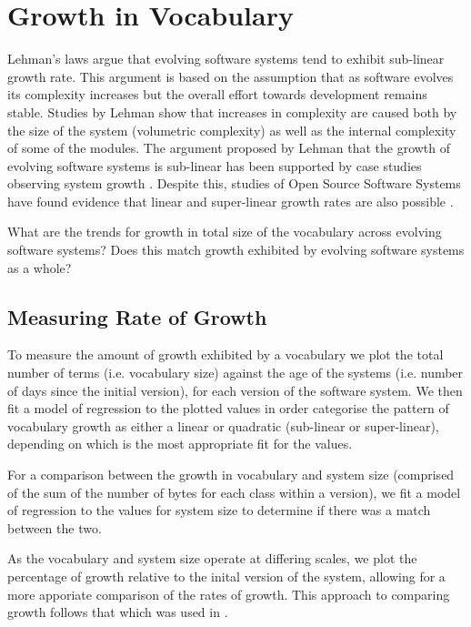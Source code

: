 \section{Growth in Vocabulary} %
\label{sec:growth_in_vocabulary}

Lehman's laws argue that evolving software systems tend to exhibit sub-linear growth rate. This argument is based on the assumption that as software evolves its complexity increases but the overall effort towards development remains stable. Studies by Lehman \cite{Lehman97a} show that increases in complexity are caused both by the size of the system (volumetric complexity) as well as the internal complexity of some of the modules. The argument proposed by Lehman that the growth of evolving software systems is sub-linear has been supported by case studies observing system growth \cite{DAmbros07a, Gall97a, Lehman97a}. Despite this, studies of Open Source Software Systems have found evidence that linear and super-linear growth rates are also possible \cite{Godfrey01a,Israeli09a,Succi01a}.

What are the trends for growth in total size of the vocabulary across evolving software systems? Does this match growth exhibited by evolving software systems as a whole?

\subsection{Measuring Rate of Growth} %
\label{sub:measuring_growth_in_vocabulary}

To measure the amount of growth exhibited by a vocabulary we plot the total number of terms (i.e. vocabulary size) against the age of the systems (i.e. number of days since the initial version), for each version of the software system. We then fit a model of regression to the plotted values in order categorise the pattern of vocabulary growth as either a linear or quadratic (sub-linear or super-linear), depending on which is the most appropriate fit for the values.

For a comparison between the growth in vocabulary and system size (comprised of the sum of the number of bytes for each class within a version), we fit a model of regression to the values for system size to determine if there was a match between the two.

As the vocabulary and system size operate at differing scales, we plot the percentage of growth relative to the inital version of the system, allowing for a more apporiate comparison of the rates of growth. This approach to comparing growth follows that which was used in \cite{Paulson04a}.

